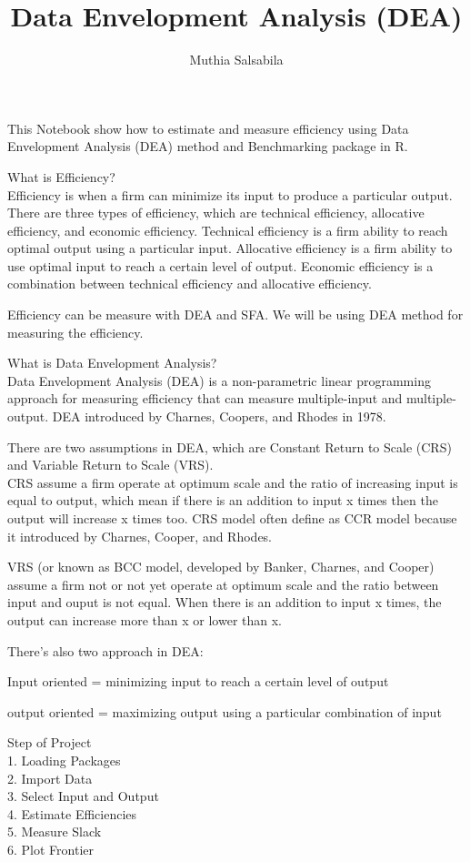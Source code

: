 \documentclass[
]{article}
\title{Data Envelopment Analysis (DEA)}
\author{Muthia Salsabila}
\date{}
\begin{document}
\maketitle

This Notebook show how to estimate and measure efficiency using Data
Envelopment Analysis (DEA) method and Benchmarking package in R.

What is Efficiency?\\
Efficiency is when a firm can minimize its input to produce a particular
output. There are three types of efficiency, which are technical
efficiency, allocative efficiency, and economic efficiency. Technical
efficiency is a firm ability to reach optimal output using a particular
input. Allocative efficiency is a firm ability to use optimal input to
reach a certain level of output. Economic efficiency is a combination
between technical efficiency and allocative efficiency.

Efficiency can be measure with DEA and SFA. We will be using DEA method
for measuring the efficiency.

What is Data Envelopment Analysis?\\
Data Envelopment Analysis (DEA) is a non-parametric linear programming
approach for measuring efficiency that can measure multiple-input and
multiple-output. DEA introduced by Charnes, Coopers, and Rhodes in 1978.

There are two assumptions in DEA, which are Constant Return to Scale
(CRS) and Variable Return to Scale (VRS).\\

CRS assume a firm operate at optimum scale and the ratio of increasing
input is equal to output, which mean if there is an addition to input x
times then the output will increase x times too. CRS model often define
as CCR model because it introduced by Charnes, Cooper, and Rhodes.

VRS (or known as BCC model, developed by Banker, Charnes, and Cooper)
assume a firm not or not yet operate at optimum scale and the ratio
between input and ouput is not equal. When there is an addition to input
x times, the output can increase more than x or lower than x.

There's also two approach in DEA:

Input oriented = minimizing input to reach a certain level of output

output oriented = maximizing output using a particular combination of
input

Step of Project\\
1. Loading Packages\\
2. Import Data\\
3. Select Input and Output\\
4. Estimate Efficiencies\\
5. Measure Slack\\
6. Plot Frontier
\end{document}
